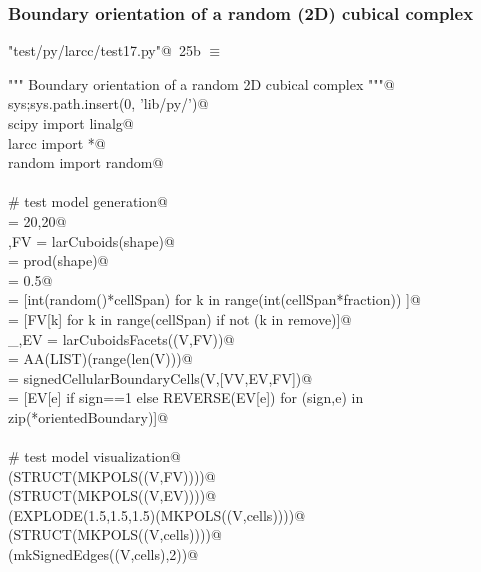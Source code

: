 \documentclass[11pt,oneside]{article}	%
\begin{document}
\subsubsection{Boundary orientation of a random (2D) cubical complex}

\begin{flushleft} \small \label{scrap44}
\protect{}\verb@"test/py/larcc/test17.py"@\nobreak\ {\footnotesize 25b }$\equiv$
\vspace{-1ex}
\begin{list}{}{} \item
\mbox{}\verb@""" Boundary orientation of a random 2D cubical complex """@\\
\mbox{}\verb@import sys;sys.path.insert(0, 'lib/py/')@\\
\mbox{}\verb@from scipy import linalg@\\
\mbox{}\verb@from larcc import *@\\
\mbox{}\verb@from random import random@\\
\mbox{}\verb@@\\
\mbox{}\verb@# test model generation@\\
\mbox{}\verb@shape = 20,20@\\
\mbox{}\verb@V,FV = larCuboids(shape)@\\
\mbox{}\verb@cellSpan = prod(shape)@\\
\mbox{}\verb@fraction = 0.5@\\
\mbox{}\verb@remove = [int(random()*cellSpan) for k in range(int(cellSpan*fraction)) ]@\\
\mbox{}\verb@FV = [FV[k] for k in range(cellSpan) if not (k in remove)]@\\
\mbox{}\verb@_,EV = larCuboidsFacets((V,FV))@\\
\mbox{}\verb@VV = AA(LIST)(range(len(V)))@\\
\mbox{}\verb@orientedBoundary = signedCellularBoundaryCells(V,[VV,EV,FV])@\\
\mbox{}\verb@cells = [EV[e] if sign==1 else REVERSE(EV[e]) for (sign,e) in zip(*orientedBoundary)]@\\
\mbox{}\verb@@\\
\mbox{}\verb@# test model visualization@\\
\mbox{}\verb@VIEW(STRUCT(MKPOLS((V,FV))))@\\
\mbox{}\verb@VIEW(STRUCT(MKPOLS((V,EV))))@\\
\mbox{}\verb@VIEW(EXPLODE(1.5,1.5,1.5)(MKPOLS((V,cells))))@\\
\mbox{}\verb@VIEW(STRUCT(MKPOLS((V,cells))))@\\
\mbox{}\verb@VIEW(mkSignedEdges((V,cells),2))@\\
\mbox{}\verb@@{\NWsep}
\end{list}
\vspace{-2ex}
\end{flushleft}
\end{document}
